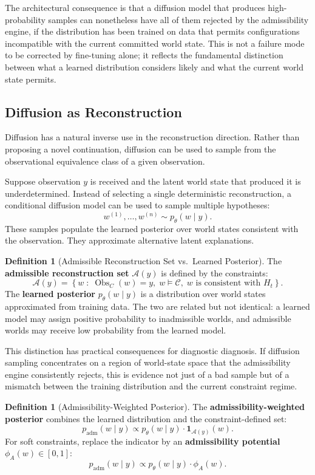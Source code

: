 \documentclass[12pt,a4paper]{article}
\theoremstyle{plain}
\theoremstyle{definition}
\newtheorem{definition}[theorem]{Definition}
\theoremstyle{remark}
\DeclareMathOperator{\Obs}{Obs}
\begin{document}
The architectural consequence is that a diffusion model that produces high-probability samples can nonetheless have all of them rejected by the admissibility engine, if the distribution has been trained on data that permits configurations incompatible with the current committed world state. This is not a failure mode to be corrected by fine-tuning alone; it reflects the fundamental distinction between what a learned distribution considers likely and what the current world state permits.

\subsection{Diffusion as Reconstruction}

Diffusion has a natural inverse use in the reconstruction direction. Rather than proposing a novel continuation, diffusion can be used to sample from the observational equivalence class of a given observation.

Suppose observation $y$ is received and the latent world state that produced it is underdetermined. Instead of selecting a single deterministic reconstruction, a conditional diffusion model can be used to sample multiple hypotheses:
\[
w^{(1)}, \ldots, w^{(n)} \sim p_\theta(w \mid y).
\]
These samples populate the learned posterior over world states consistent with the observation. They approximate alternative latent explanations.

\begin{definition}[Admissible Reconstruction Set vs.\ Learned Posterior]
The \textbf{admissible reconstruction set} $\mathcal{A}(y)$ is defined by the constraints:
\[
\mathcal{A}(y) = \left\{ w \;:\; \Obs_{C}(w) = y,\; w \models \mathcal{C},\; w \text{ is consistent with } H_t \right\}.
\]
The \textbf{learned posterior} $p_\theta(w \mid y)$ is a distribution over world states approximated from training data. The two are related but not identical: a learned model may assign positive probability to inadmissible worlds, and admissible worlds may receive low probability from the learned model.
\end{definition}

This distinction has practical consequences for diagnostic diagnosis. If diffusion sampling concentrates on a region of world-state space that the admissibility engine consistently rejects, this is evidence not just of a bad sample but of a mismatch between the training distribution and the current constraint regime.

\begin{definition}[Admissibility-Weighted Posterior]
The \textbf{admissibility-weighted posterior} combines the learned distribution and the constraint-defined set:
\[
p_{\mathrm{adm}}(w \mid y) \propto p_\theta(w \mid y) \cdot \mathbf{1}_{\mathcal{A}(y)}(w).
\]
For soft constraints, replace the indicator by an \textbf{admissibility potential} $\phi_A(w) \in [0,1]$:
\[
p_{\mathrm{adm}}(w \mid y) \propto p_\theta(w \mid y) \cdot \phi_A(w).
\]
\end{definition}
\end{document}
